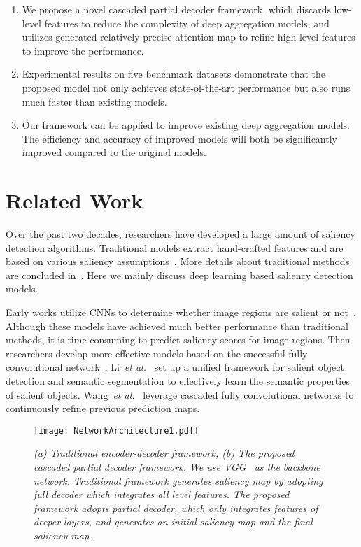 \documentclass[10pt,twocolumn,letterpaper]{article}
\begin{document}
\begin{enumerate}[(1)]
  \item We propose a novel cascaded partial decoder framework, which discards low-level features to reduce the complexity of deep aggregation models, and utilizes generated relatively precise attention map to refine high-level features to improve the performance.
  \item Experimental results on five benchmark datasets demonstrate that the proposed model not only achieves state-of-the-art performance but also runs much faster than existing models.
  \item Our framework can be applied to improve existing deep aggregation models. The efficiency and accuracy of improved models will both be significantly improved compared to the original models.
\end{enumerate}

\section{Related Work}
Over the past two decades, researchers have developed a large amount of saliency detection algorithms. Traditional models extract hand-crafted features and are based on various saliency assumptions~\cite{2009FT,2015GlobalContrast,1998Itti,2014wCtr}. More details about traditional methods are concluded in~\cite{SalObjSurvey,2015SalObjBenchmark}.
Here we mainly discuss deep learning based saliency detection models.

Early works utilize CNNs to determine whether image regions are salient or not~\cite{2016ELD,2015MDF,2015LEGS,2015MCDL}. Although these models have achieved much better performance than traditional methods, it is time-consuming to predict saliency scores for image regions. Then researchers develop more effective models based on the successful fully convolutional network~\cite{2015FCN}. Li~\emph{et al.}~\cite{2016MTDS} set up a unified framework for salient object detection and semantic segmentation to effectively learn the semantic properties of salient objects. Wang~\emph{et al.}~\cite{2016RFCN} leverage cascaded fully convolutional networks to continuously refine previous prediction maps.

\begin{figure*}[ht]
  \centering
  \texttt{[image: NetworkArchitecture1.pdf]}\\
  \caption{\emph{(a) Traditional encoder-decoder framework, (b) The proposed cascaded partial decoder framework. We use VGG~\cite{2014VGG} as the backbone network. Traditional framework generates saliency map  by adopting full decoder which integrates all level features. The proposed framework adopts partial decoder, which only integrates features of deeper layers, and generates an initial saliency map  and the final saliency map .}}\label{Structure}
\end{figure*}
\end{document}
